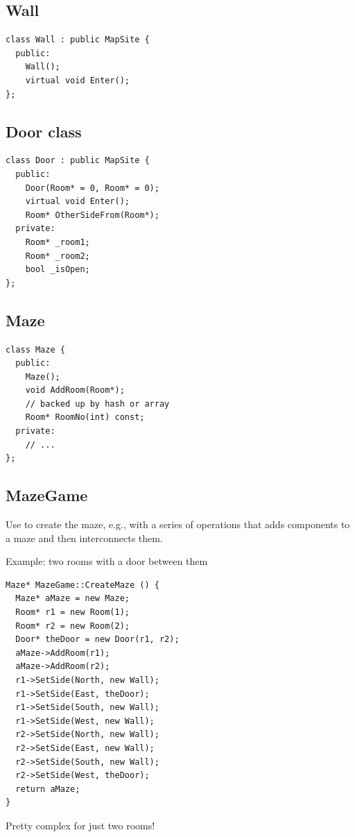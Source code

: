 \documentclass[11pt]{report}
\begin{document}
\subsection{Wall}

\begin{lstlisting}
class Wall : public MapSite {
  public:
    Wall();
    virtual void Enter();
};
\end{lstlisting}

\subsection{Door class}
\begin{lstlisting}
class Door : public MapSite {
  public:
    Door(Room* = 0, Room* = 0);
    virtual void Enter();
    Room* OtherSideFrom(Room*);
  private:
    Room* _room1;
    Room* _room2;
    bool _isOpen;
};
\end{lstlisting}

\subsection*{Maze}

\begin{lstlisting}
class Maze {
  public:
    Maze();
    void AddRoom(Room*);
    // backed up by hash or array
    Room* RoomNo(int) const; 
  private:
    // ...
};
\end{lstlisting}

\subsection*{MazeGame}

Use to create the maze, e.g., with a series of operations that adds components
to a maze and then interconnects them.

Example: two rooms with a door between them
\begin{lstlisting}
Maze* MazeGame::CreateMaze () {
  Maze* aMaze = new Maze;
  Room* r1 = new Room(1);
  Room* r2 = new Room(2);
  Door* theDoor = new Door(r1, r2);
  aMaze->AddRoom(r1);
  aMaze->AddRoom(r2);
  r1->SetSide(North, new Wall);
  r1->SetSide(East, theDoor);
  r1->SetSide(South, new Wall);
  r1->SetSide(West, new Wall);
  r2->SetSide(North, new Wall);
  r2->SetSide(East, new Wall);
  r2->SetSide(South, new Wall);
  r2->SetSide(West, theDoor);
  return aMaze;
}
\end{lstlisting}
Pretty complex for just two rooms!
\end{document}
